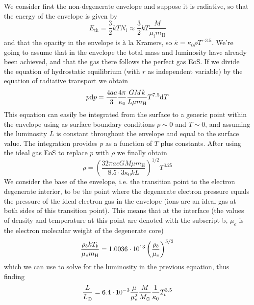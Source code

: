 We consider first the non-degenerate envelope and suppose it is radiative, so that the energy of the envelope is given by 
\begin{equation}
    E_{\text{th}} = \frac{3}{2}kT N_{i} \approx \frac{3}{2}kT\frac{M}{\mu_{i}m_{\text{H}}}
    \label{eq:envelope_energy}
\end{equation}
and that the opacity in the envelope is à la Kramers, so $\bar{\kappa} = \kappa_{0}\rho T^{-3.5}$. We're going to assume that in the envelope the total mass and luminosity have already been achieved, and that the gas there follows the perfect gas EoS. If we divide the equation of hydrostatic equilibrium (with $r$ as independent variable) by the equation of radiative transport we obtain
\begin{equation}
    p\text{d}p = \frac{4ac}{3}\frac{4\pi}{\kappa_{0}}\frac{GMk}{L\mu m_{\text{H}}}T^{7.5}\text{d}T
    \label{eq:pressuretemp-WD}
\end{equation}
This equation can easily be integrated from the surface to a generic point within the envelope using as surface boundary conditions $p \sim 0$ and $T \sim 0$, and assuming the luminosity $L$ is constant throughout the envelope and equal to the surface value. The integration provides $p$ as a function of $T$ plus constants. After using the ideal gas EoS to replace $p$ with $\rho$ we finally obtain
\begin{equation}
    \rho = \left(\frac{32\pi ac GM \mu m_{\text{H}}}{8.5\cdot 3\kappa_{0}k L}\right)^{1/2}T^{3.25}
\end{equation}
We consider the base of the envelope, i.e. the transition point to the electron degenerate interior, to be the point where the degenerate electron pressure equals the pressure of the ideal electron gas in the envelope (ions are an ideal gas at both sides of this transition point). This means that at the interface (the values of density and temperature at this point are denoted with the subscript b, $\mu_{e}$ is the electron molecular weight of the degenerate core)
\begin{equation}
    \frac{\rho_{b}kT_{b}}{\mu_{e}m_{\text{H}}} = 1.0036\cdot 10^{13}\left(\frac{\rho_{b}}{\mu_{e}}\right)^{5/3}
\end{equation}
which we can use to solve for the luminosity in the previous equation, thus finding
\begin{equation}
    \frac{L}{L_{\odot}} = 6.4\cdot 10^{-3}\frac{\mu}{\mu_{e}^{2}}\frac{M}{M_{\odot}}\frac{1}{\kappa_{0}}T_{b}^{3.5}
    \label{eq:wd-templum}
\end{equation}
